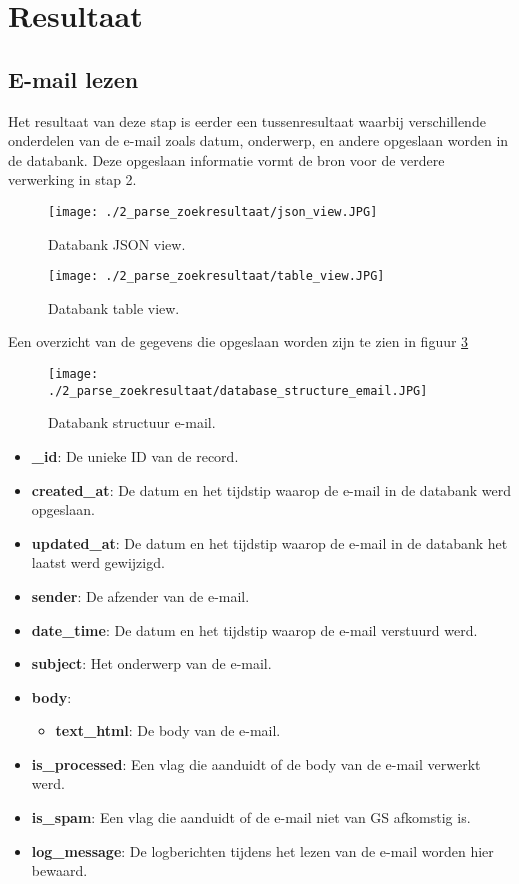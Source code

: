 \section{Resultaat}
\subsection{E-mail lezen}
Het resultaat van deze stap is eerder een tussenresultaat waarbij verschillende onderdelen van de e-mail zoals datum, onderwerp, en andere opgeslaan worden in de databank. Deze opgeslaan informatie vormt de bron voor de verdere verwerking in stap 2.
\begin{figure}[h!]
    \centering
    \texttt{[image: ./2\_parse\_zoekresultaat/json\_view.JPG]}
    \caption[Databank JSON view.]{\label{fig:Databank JSON view}Databank JSON view.}
\end{figure}
\begin{figure}[h!]
    \centering
    \texttt{[image: ./2\_parse\_zoekresultaat/table\_view.JPG]}
    \caption[Databank table view.]{\label{fig:Databank table view}Databank table view.}
\end{figure}
\FloatBarrier
Een overzicht van de gegevens die opgeslaan worden zijn te zien in figuur \ref{fig:databank_structuur_email}
\begin{figure}[h!]
    \centering
    \texttt{[image: ./2\_parse\_zoekresultaat/database\_structure\_email.JPG]}
    \caption[Databank structuur e-mail.]{\label{fig:databank_structuur_email}Databank structuur e-mail.}
\end{figure}
\begin{itemize}
    \item \textbf{\_id}: De unieke ID van de record.
    \item \textbf{created\_at}: De datum en het tijdstip waarop de e-mail in de databank werd opgeslaan.
    \item \textbf{updated\_at}: De datum en het tijdstip waarop de e-mail in de databank het laatst werd gewijzigd. 
    \item \textbf{sender}: De afzender van de e-mail.
    \item \textbf{date\_time}: De datum en het tijdstip waarop de e-mail verstuurd werd.
    \item \textbf{subject}: Het onderwerp van de e-mail. 
    \item \textbf{body}: 
        \begin{itemize}
            \item \textbf{text\_html}: De body van de e-mail.
        \end{itemize}
    \item \textbf{is\_processed}: Een vlag die aanduidt of de body van de e-mail verwerkt werd.
    \item \textbf{is\_spam}: Een vlag die aanduidt of de e-mail niet van GS afkomstig is. 
    \item \textbf{log\_message}: De logberichten tijdens het lezen van de e-mail worden hier bewaard. 
\end{itemize}
\FloatBarrier
